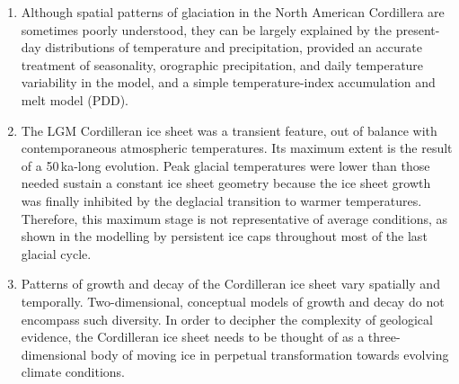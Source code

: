 \documentclass[a4paper]{kappa}
\begin{document}
\begin{enumerate}

\item Although spatial patterns of glaciation in the North American Cordillera
are sometimes poorly understood, they can be largely explained by the
present-day distributions of temperature and precipitation, provided an
accurate treatment of seasonality, orographic precipitation, and daily
temperature variability in the model, and a simple temperature-index
accumulation and melt model (PDD).

\item The LGM Cordilleran ice sheet was a transient feature, out of balance
with contemporaneous atmospheric temperatures. Its maximum extent is the result
of a 50\,ka-long evolution. Peak glacial temperatures were lower than those
needed sustain a constant ice sheet geometry because the ice sheet growth was
finally inhibited by the deglacial transition to warmer temperatures.
Therefore, this maximum stage is not representative of average conditions, as
shown in the modelling by persistent ice caps throughout most of the last
glacial cycle.

\item Patterns of growth and decay of the Cordilleran ice sheet vary spatially
and temporally. Two-dimensional, conceptual models of growth and decay
\citep[e.g.][]{Fulton.1991, Margold.etal.2013a} do not encompass such
diversity. In order to decipher the complexity of geological evidence, the
Cordilleran ice sheet needs to be thought of as a three-dimensional body of
moving ice in perpetual transformation towards evolving climate conditions.

\end{enumerate}

\renewcommand{\urlprefix}[0]{}  %



\end{document}
